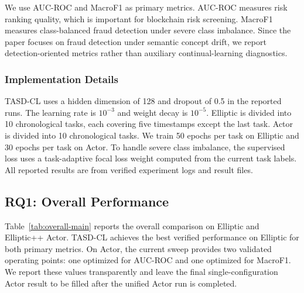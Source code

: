 We use AUC-ROC and MacroF1 as primary metrics. AUC-ROC measures risk ranking quality, which is important for blockchain risk screening. MacroF1 measures class-balanced fraud detection under severe class imbalance. Since the paper focuses on fraud detection under semantic concept drift, we report detection-oriented metrics rather than auxiliary continual-learning diagnostics.

\subsubsection{Implementation Details}
\label{subsubsec:implementation-details}

TASD-CL uses a hidden dimension of 128 and dropout of 0.5 in the reported runs. The learning rate is $10^{-3}$ and weight decay is $10^{-5}$. Elliptic is divided into 10 chronological tasks, each covering five timestamps except the last task. Actor is divided into 10 chronological tasks. We train 50 epochs per task on Elliptic and 30 epochs per task on Actor. To handle severe class imbalance, the supervised loss uses a task-adaptive focal loss weight computed from the current task labels. All reported results are from verified experiment logs and result files.

\subsection{RQ1: Overall Performance}
\label{subsec:overall-performance}

Table~\ref{tab:overall-main} reports the overall comparison on Elliptic and Elliptic++ Actor. TASD-CL achieves the best verified performance on Elliptic for both primary metrics. On Actor, the current sweep provides two validated operating points: one optimized for AUC-ROC and one optimized for MacroF1. We report these values transparently and leave the final single-configuration Actor result to be filled after the unified Actor run is completed.

